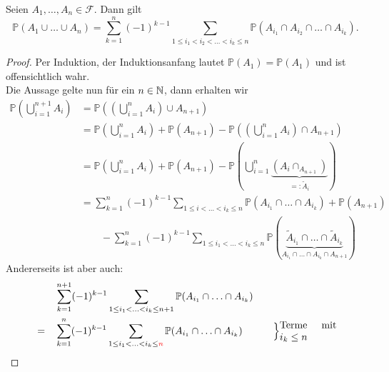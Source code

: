 \begin{corollary}\label{cor:einschluss-ausschluss-prinzip}
    Seien $A_1,\ldots,A_n \in \mathcal{F}$. Dann gilt
    \[
        \mathbb{P}(A_1 \cup \ldots \cup A_n) = \sum_{k=1}^{n} (-1)^{k-1} \sum_{1\leq i_1<i_2<\ldots<i_k \leq n} \mathbb{P}(A_{i_1} \cap A_{i_2} \cap \ldots \cap A_{i_k})
    .\] 
\end{corollary}
\begin{proof}
    Per Induktion, der Induktionsanfang lautet  $\mathbb{P}(A_1) = \mathbb{P}(A_1)$ und ist offensichtlich wahr. \\
    Die Aussage gelte nun für ein $n\in \mathbb{N}$, dann erhalten wir
    \begin{equation}
        \begin{split}
            \mathbb{P}\left( \bigcup_{i=1}^{n+1} A_i \right)  &= \mathbb{P}\left( \left(\bigcup_{i=1}^{n}A_i \right) \cup A_{n+1}\right)  \\
                                                              &= \mathbb{P}\left(\bigcup_{i=1}^{n} A_i\right) + \mathbb{P}(A_{n+1}) - \mathbb{P}\left( \left( \bigcup_{i=1}^n A_i \right) \cap A_{n+1} \right)  \\
                                                              &= \mathbb{P}\left( \bigcup_{i=1}^{n} A_i \right)  + \mathbb{P}(A_{n+1}) - \mathbb{P}\left( \bigcup_{i=1}^n \underbrace{(A_i \cap _{A_{n+1}})}_{=: \tilde{A}_i} \right)  \\
                                                              &= \sum_{k=1}^{n} (-1)^{k-1} \sum_{1\leq i<\ldots<i_k \leq n} \mathbb{P}(A_{i_1} \cap \ldots \cap A_{i_k}) + \mathbb{P}(A_{n+1}) \\
                                                              &\qquad -\sum_{k=1}^n (-1)^{k-1} \sum_{1\leq i_1 < \ldots < i_k \leq n} \mathbb{P}(\underbrace{\tilde{A}_{i_1} \cap \ldots \cap \tilde{A}_{i_k}}_{A_{i_1} \cap \ldots \cap A_{i_k} \cap A_{n+1}})
        \end{split}
    \end{equation}
    Andererseits ist aber auch:
    \begin{alignat*}{5}
           &\quad&  &\sum_{k=1} ^{n+1} (-1)^{k-1} \sum_{1\leq i_1<\ldots<i_k \leq  n+1} \mathbb{P}(A_{i_1} \cap \ldots \cap A_{i_k}) &\quad & \\
           &= & &\sum\limits_{k=1}^{n}(-1)^{k-1} \sum\limits_{1\leq i_1< \ldots < i_k \leq  \color{red} n} \mathbb{P}(A_{i_1} \cap \ldots \cap A_{i_k}) & \quad &\Big\}\text{\parbox{2cm}{Terme mit $i_k\leq n$}} \\

\end{alignat*}
\end{proof}
